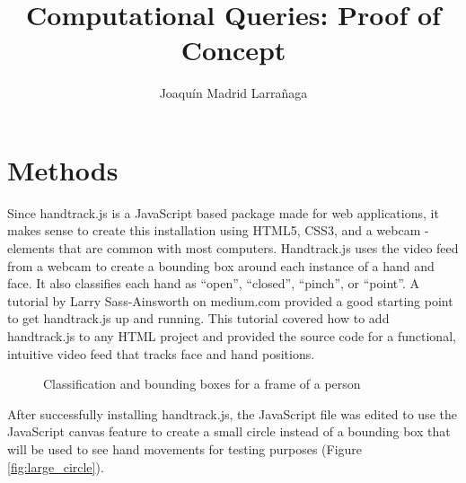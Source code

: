 \documentclass[10pt,twocolumn]{article}
\title{Computational Queries: Proof of Concept}
\author{Joaquín Madrid Larrañaga}
\affiliation{Occidental College}
\begin{document}
\maketitle

\section{Methods}
Since handtrack.js is a JavaScript based package made for web applications, it makes sense to create this installation using HTML5, CSS3, and a webcam - elements that are common with most computers.   Handtrack.js uses the video feed from a webcam to create a bounding box around each instance of a hand and face.  It also classifies each hand as ``open'', ``closed'', ``pinch'', or ``point''.  A tutorial by Larry Sass-Ainsworth on medium.com \cite{} provided a good starting point to get handtrack.js up and running.  This tutorial covered how to add handtrack.js to any HTML project and provided the source code for a functional, intuitive video feed that tracks face and hand positions. 

\begin{figure}[hbh]
\begin{center}
\vspace{.5cm}
\caption{Classification and bounding boxes for a frame of a person}
\label{fig:bounding_boxes}
\end{center}
\end{figure}

After successfully installing handtrack.js, the JavaScript file was edited to use the JavaScript canvas feature to create a small circle instead of a bounding box that will be used to see hand movements for testing purposes (Figure \ref{fig:large_circle}). 
\end{document}
